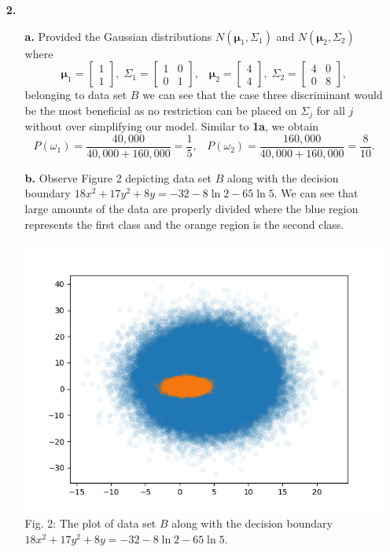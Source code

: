 \documentclass[ 12pt ]{article}
\begin{document}
\begin{enumerate}
    \item[\textbf{2.}]
        \begin{enumerate}
            \item[\textbf{a.}] Provided the Gaussian distributions $N(\mathbf{\mu}_1, \Sigma_1)$ and $N(\mathbf{\mu}_2, \Sigma_2)$ where $$\mathbf{\mu}_1 = \begin{bmatrix} 1 \\ 1
                \end{bmatrix},\; \Sigma_1 = \begin{bmatrix} 1 & 0 \\ 0 & 1 \end{bmatrix},\;\;\; \mathbf{\mu}_2 = \begin{bmatrix} 4 \\ 4 \end{bmatrix},\; \Sigma_2 = \begin{bmatrix} 4 & 0 \\
                0 & 8 \end{bmatrix},$$ belonging to data set $B$ we can see that the case three discriminant would be the most beneficial as no restriction can be placed on $\Sigma_j$
                for all $j$ without over simplifying our model. Similar to \textbf{1a}, we obtain $$P(\omega_1) = \frac{40,000}{40,000 + 160,000} = \frac{1}{5},\;\;\; P(\omega_2) =
                \frac{160,000}{40,000 + 160,000} = \frac{8}{10}.$$

            \item[\textbf{b.}] Observe Figure 2 depicting data set $B$ along with the decision boundary $18 x^2 + 17 y^2 + 8 y = -32 - 8 \ln 2 - 65 \ln 5$. We can see that large amounts
                of the data are properly divided where the blue region represents the first class and the orange region is the second class.
                \begin{center}
                    \includegraphics{figure2}
                    \scriptsize
                    Fig. 2: The plot of data set $B$ along with the decision boundary $18 x^2 + 17 y^2 + 8 y = -32 - 8 \ln 2 - 65 \ln 5$.
                \end{center}


\end{enumerate}
\end{enumerate}
\end{document}
